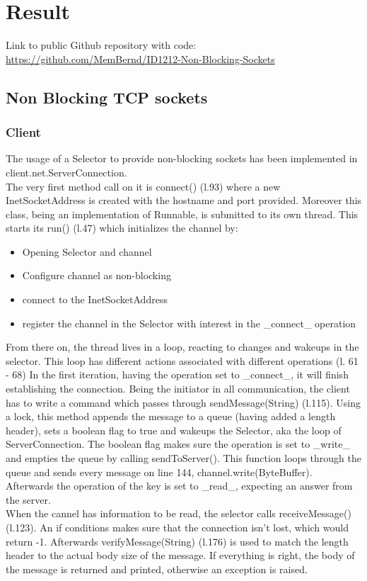 \documentclass[a4paper]{scrartcl}
\begin{document}
\section{Result}


Link to public Github repository with code:
\href{https://github.com/MemBernd/ID1212-Non-Blocking-Sockets}{https://github.com/MemBernd/ID1212-Non-Blocking-Sockets}

\subsection{Non Blocking TCP sockets}

\subsubsection{Client}

The usage of a Selector to provide non-blocking sockets has been implemented in client.net.ServerConnection.
\\The very first method call on it is connect() (l.93) where a new InetSocketAddress is created with the hostname and port provided.
Moreover this class, being an implementation of Runnable, is submitted to its own thread.
This starts its run() (l.47) which initializes the channel by:
\begin{itemize}
        \item Opening Selector and channel
        \item Configure channel as non-blocking
        \item connect to the InetSocketAddress
        \item register the channel in the Selector with interest in the _connect_ operation
\end{itemize}
From there on, the thread lives in a loop, reacting to changes and wakeups in the selector.
This loop has different actions associated with different operations (l. 61 - 68)
In the first iteration, having the operation set to _connect_, it will finish establishing the connection.
Being the initiator in all communication, the client has to write a command which passes through sendMessage(String) (l.115).
Using a lock, this method appends the message to a queue (having added a length header), sets a boolean flag to true and wakeups the Selector, aka the loop of ServerConnection.
The boolean flag makes sure the operation is set to _write_ and empties the queue by calling sendToServer().
This function loops through the queue and sends every message on line 144, channel.write(ByteBuffer).
Afterwards the operation of the key is set to _read_, expecting an answer from the server.
\\When the cannel has information to be read, the selector calls receiveMessage() (l.123).
An if conditions makes sure that the connection isn't lost, which would return -1.
Afterwards verifyMessage(String) (l.176) is used to match the length header to the actual body size of the message.
If everything is right, the body of the message is returned and printed, otherwise an exception is raised.
\end{document}
